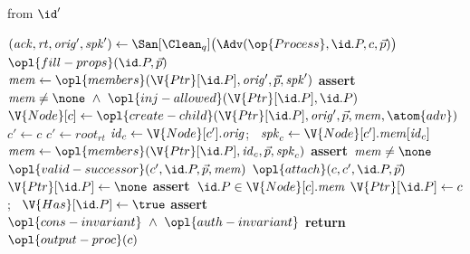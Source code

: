 \begin{interface}
{ \quad from $\id'$
\begin{algorithmic}[1]
\algcont
\State $(\mathit{ack}, \mathit{rt}, \mathit{orig}', \mathit{spk}') \gets \San[\Clean_{q}]\bigl(\Adv(\op{Process}, \id.P, c, \vec{p})\bigr)$
\EndIf
\State $\opl{fill-props}(\id.P, \vec{p})$
 \label{ln:cgkainject}
  \State $\mathit{mem} \gets \opl{members}(\V{Ptr}[\id.P], \mathit{orig}', \vec{p}, \mathit{spk}')$
  \State \textbf{assert}\ $\mathit{mem} \neq \none \ \wedge\ \opl{inj-allowed}(\V{Ptr}[\id.P], \id.P)$ \label{ln:cgkainjallowed}
  \State $\V{Node}[c] \gets \opl{create-child}(\V{Ptr}[\id.P], \mathit{orig}', \vec{p}, \mathit{mem}, \atom{adv})$
\EndIf
{}
  \State $c' \gets c$
    \State $c' \gets \mathit{root}_{\mathit{rt}}$
  \EndIf
  \State $\mathit{id}_c \gets \V{Node}[c'].\mathit{orig}$; \ $\mathit{spk}_c \gets \V{Node}[c'].\mathit{mem}[\mathit{id}_c]$
  \State $\mathit{mem} \gets \opl{members}(\V{Ptr}[\id.P], \mathit{id}_c, \vec{p}, \mathit{spk}_c)$
  \State \textbf{assert}\ $\mathit{mem} \neq \none$
  \State $\opl{valid-successor}(c', \id.P, \vec{p}, \mathit{mem})$
    \State $\opl{attach}(c, c', \id.P, \vec{p})$
  \EndIf
\EndIf
{} \label{ln:cgkaremoved}
  \State $\V{Ptr}[\id.P] \gets \none$
\EndIf
{}
  \State \textbf{assert}\ $\id.P \in \V{Node}[c].\mathit{mem}$
  \State $\V{Ptr}[\id.P] \gets c$; \ $\V{Has}[\id.P] \gets \true$
\EndIf
\State \textbf{assert}\ $\opl{cons-invariant} \ \wedge\ \opl{auth-invariant}$
\State \textbf{return} $\opl{output-proc}(c)$
\algsave
\end{algorithmic}
\vspace{1.4ex}

}
\end{interface}
